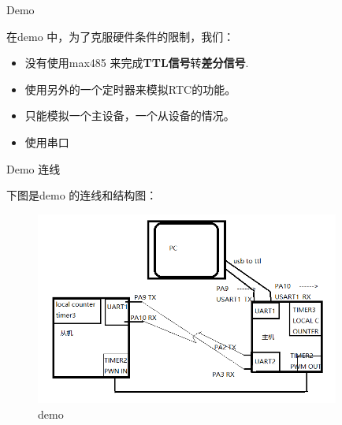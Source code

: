 \begin{frame}[fragile]{Demo}

在demo 中，为了克服硬件条件的限制，我们：
\begin{itemize}
    \item 没有使用max485 来完成\textbf{TTL信号}转\textbf{差分信号}.
    \item 使用另外的一个定时器来模拟RTC的功能。
    \item 只能模拟一个主设备，一个从设备的情况。
    \item 使用串口
\end{itemize}

\end{frame}


\begin{frame}[fragile]{Demo 连线}

下图是demo 的连线和结构图：
\begin{figure}[htbp]
\begin{center}
\includegraphics[width=10cm]{img/demo0}
\caption{demo}
\label{Overview}
\end{center}
\vspace{-0.5em}
\end{figure}

\end{frame}
